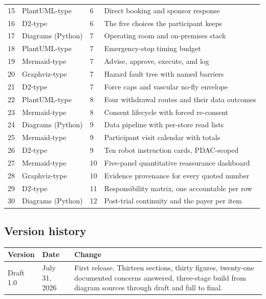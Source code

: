 \begin{tabularx}{\textwidth}{C{1.0cm} L{3.6cm} C{1.2cm} Y}
15 & PlantUML-type & 6 & Direct booking and sponsor response \\
16 & D2-type & 6 & The five choices the participant keeps \\
17 & Diagrams (Python) & 7 & Operating room and on-premises stack \\
18 & PlantUML-type & 7 & Emergency-stop timing budget \\
19 & Mermaid-type & 7 & Advise, approve, execute, and log \\
20 & Graphviz-type & 7 & Hazard fault tree with named barriers \\
21 & D2-type & 7 & Force caps and vascular no-fly envelope \\
22 & PlantUML-type & 8 & Four withdrawal routes and their data outcomes \\
23 & Mermaid-type & 8 & Consent lifecycle with forced re-consent \\
24 & Diagrams (Python) & 9 & Data pipeline with per-store read lists \\
25 & Mermaid-type & 9 & Participant visit calendar with totals \\
26 & D2-type & 9 & Ten robot instruction cards, PDAC-scoped \\
27 & Mermaid-type & 10 & Five-panel quantitative reassurance dashboard \\
28 & Graphviz-type & 10 & Evidence provenance for every quoted number \\
29 & D2-type & 11 & Responsibility matrix, one accountable per row \\
30 & Diagrams (Python) & 12 & Post-trial continuity and the payer per item \\
\bottomrule
\end{tabularx}

\vspace{0.30em}

\subsection{Version history}

\vspace{0.30em}

\noindent\begin{tabularx}{\textwidth}{L{2.0cm} L{2.6cm} Y}
\toprule
\textbf{Version} & \textbf{Date} & \textbf{Change} \\
\midrule
Draft 1.0 & July 31, 2026 & First release. Thirteen sections, thirty figures, twenty-one documented concerns answered, three-stage build from diagram sources through draft and full to final. \\
\bottomrule
\end{tabularx}

